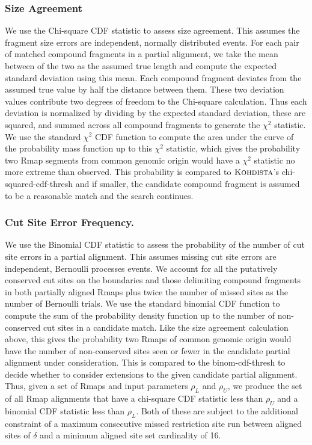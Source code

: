 \subsubsection{Size Agreement}
We use the Chi-square CDF statistic to assess size agreement.  This assumes the fragment size errors are independent, normally distributed events.  For each pair of matched compound fragments in a partial alignment, we take the mean between of the two as the assumed true length and
compute the expected standard deviation using this mean.  Each compound fragment deviates from the assumed true value by half the distance between them.  These two deviation values contribute two degrees of freedom to the Chi-square calculation.  Thus each deviation is normalized by dividing by the expected standard deviation, these are squared, and summed across all compound fragments to generate the $\chi^2$ statistic.  We use the standard $\chi^2$ CDF function  to compute the area under the curve of the probability mass function up to this $\chi^2$ statistic, which gives the probability two Rmap segments from common genomic origin would have a $\chi^2$ statistic no more extreme than observed.  This probability is compared to $\mbox{\rm \textsc{Kohdista}}$'s chi-squared-cdf-thresh and if smaller, the candidate compound fragment is assumed to be a reasonable match and the search continues.




\subsubsection{Cut Site Error Frequency.}
We use the Binomial CDF statistic to assess the probability of the number of cut site errors in a partial alignment.   This assumes missing cut site errors are independent, Bernoulli processes events.  We account for all the putatively conserved cut sites on the boundaries and those delimiting compound fragments in both partially aligned Rmaps plus twice the number of missed sites as the number of Bernoulli trials. We use the standard binomial CDF function to compute the sum of the probability density function up to the number of non-conserved cut sites in a candidate match.  Like the size agreement calculation above, this gives the probability two Rmaps of common genomic origin would have the number of non-conserved sites seen or fewer in the candidate partial alignment under consideration.  This is compared to the binom-cdf-thresh to decide whether to consider extensions to the given candidate partial alignment.  Thus, given a set of Rmaps and input parameters $\rho_{L}$ and $\rho_{U}$, we produce the set of all Rmap alignments that have a chi-square CDF statistic less than $\rho_U$ and a binomial CDF statistic less than $\rho_L$.  Both of these are subject to the additional constraint of a maximum consecutive missed restriction site run between aligned sites of $\delta$ and a minimum aligned site set cardinality of 16.



